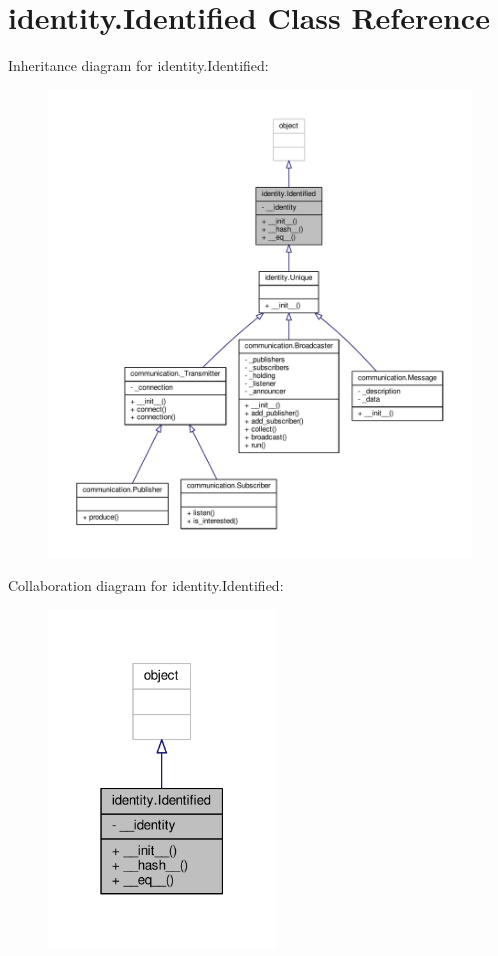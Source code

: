 \hypertarget{classidentity_1_1Identified}{}\section{identity.\+Identified Class Reference}
\label{classidentity_1_1Identified}


Inheritance diagram for identity.\+Identified\+:
\nopagebreak
\begin{figure}[H]
\begin{center}
\leavevmode
\includegraphics[width=350pt]{classidentity_1_1Identified__inherit__graph}
\end{center}
\end{figure}


Collaboration diagram for identity.\+Identified\+:\nopagebreak
\begin{figure}[H]
\begin{center}
\leavevmode
\includegraphics[width=171pt]{classidentity_1_1Identified__coll__graph}
\end{center}
\end{figure}
